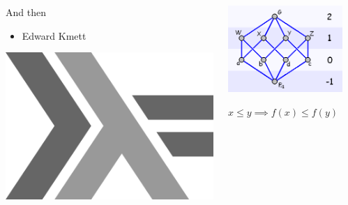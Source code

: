 \documentclass[usenames,dvipsnames,svgnames,table,aspectratio=1610,mathserif]{beamer}
\newcommand{\nl}{\vspace{\baselineskip}}
\begin{document}
\begin{frame}
\begin{columns}
\begin{column}{0.005\textwidth}
\end{column}
\begin{column}{0.4\textwidth}
And then
\begin{itemize}
\item Edward Kmett
\end{itemize}
\nl
\nl
\includegraphics[scale=0.2]{haskell.png}
\end{column}
\begin{column}{0.5\textwidth}
\includegraphics[scale=0.4]{hasse.png}

\nl
\nl

{\LARGE
  $x \le y \implies f(x) \le f(y)$
}
\end{column}
\end{columns}
\end{frame}


\end{document}
